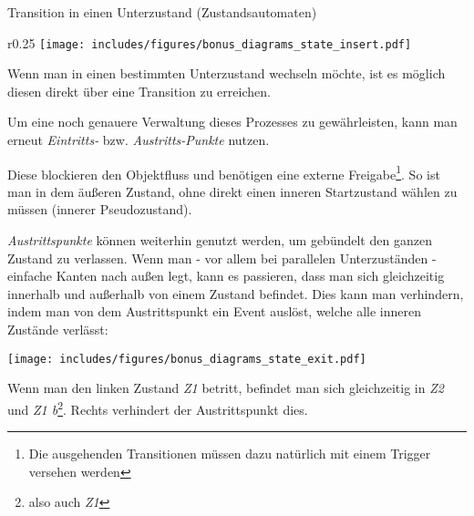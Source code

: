 \begin{bonus}{Transition in einen Unterzustand (Zustandsautomaten)}
    \begin{wrapfigure}{r}{0.25\textwidth}
        \centering
        \texttt{[image: includes/figures/bonus\_diagrams\_state\_insert.pdf]}
    \end{wrapfigure}
    Wenn man in einen bestimmten Unterzustand wechseln möchte, ist es möglich diesen direkt über eine Transition zu erreichen.

    Um eine noch genauere Verwaltung dieses Prozesses zu gewährleisten, kann man erneut \emph{Eintritts-} bzw. \emph{Austritts-Punkte} nutzen.

    Diese blockieren den Objektfluss und benötigen eine externe Freigabe\footnote{Die ausgehenden Transitionen müssen dazu natürlich mit einem Trigger versehen werden}.
    So ist man in dem äußeren Zustand, ohne direkt einen inneren Startzustand wählen zu müssen (innerer Pseudozustand).

    \emph{Austrittspunkte} können weiterhin genutzt werden, um gebündelt den ganzen Zustand zu verlassen.
    Wenn man - vor allem bei parallelen Unterzuständen - einfache Kanten nach außen legt, kann es passieren, dass man sich gleichzeitig innerhalb und außerhalb von einem Zustand befindet.
    Dies kann man verhindern, indem man von dem Austrittspunkt ein Event auslöst, welche alle inneren Zustände verlässt:

    \begin{center}
        \texttt{[image: includes/figures/bonus\_diagrams\_state\_exit.pdf]}
    \end{center}
    Wenn man den linken Zustand \emph{Z1} betritt, befindet man sich gleichzeitig in \emph{Z2} und \emph{Z1 b}\footnote{also auch \emph{Z1}}.
    Rechts verhindert der Austrittspunkt dies.
\end{bonus}

